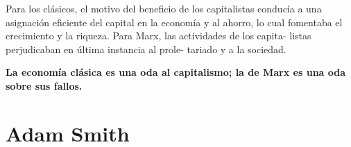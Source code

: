 \documentclass[10pt]{book}
\begin{document}
Para los clásicos, el motivo  del beneficio de los capitalistas conducía a una asignación eficiente del capital en la economía y al ahorro, lo cual fomentaba el crecimiento y la riqueza. Para Marx, las actividades de los capita- listas perjudicaban en última instancia al prole- tariado y a la sociedad.

\center \textbf{La economía clásica es una oda al capitalismo; la de Marx es una oda sobre sus fallos.}

\chapter{Adam Smith}
\end{document}

